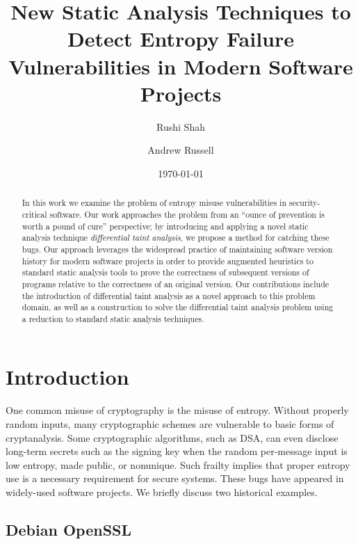 \documentclass[letterpaper,twocolumn,10pt]{article}
\begin{document}
\date{\today}

\title{\Large \bf New Static Analysis Techniques to Detect Entropy Failure Vulnerabilities in Modern Software Projects}

\author{
{\rm Rushi Shah}
\and
{\rm Andrew Russell}
}

\maketitle

\begin{abstract}
    In this work we examine the problem of entropy misuse vulnerabilities in
    security-critical software. Our work approaches the problem from an
    ``ounce of prevention is worth a pound of cure'' perspective; by introducing
    and applying a novel static analysis technique \emph{differential taint analysis},
    we propose a method for catching these bugs. Our approach
    leverages the widespread practice of maintaining software version history for
    modern software projects in order to
     provide augmented heuristics to standard static analysis tools to prove the correctness of
     subsequent versions of programs relative to the correctness of an original version.
     Our contributions include the introduction of differential taint analysis
     as a novel approach to this problem domain, as well as a construction to solve
     the differential taint analysis problem using a reduction to standard static
     analysis techniques.
\end{abstract}

\section{Introduction}

One common misuse of cryptography is the misuse of entropy. Without properly random inputs, many cryptographic schemes
are vulnerable to basic forms of cryptanalysis. Some cryptographic algorithms, such as DSA, can even disclose long-term secrets
such as the signing key when the random per-message input is low entropy, made public, or nonunique. Such frailty implies that
proper entropy use is a necessary requirement for secure systems. These bugs have appeared
in widely-used software projects. We briefly discuss two historical examples.

\subsection{Debian OpenSSL}
\end{document}
